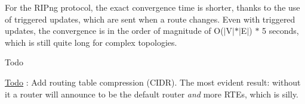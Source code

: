 For the R\+I\+Png protocol, the exact convergence time is shorter, thanks to the use of triggered updates, which are sent when a route changes. Even with triggered updates, the convergence is in the order of magnitude of O($\vert$\+V$\vert$$\ast$$\vert$\+E$\vert$) $\ast$ 5 seconds, which is still quite long for complex topologies.

\begin{DoxyRefDesc}{Todo}
\item[\hyperlink{todo__todo000062}{Todo}]\+: Add routing table compression (C\+I\+DR). The most evident result\+: without it a router will announce to be the default router {\itshape and} more R\+T\+Es, which is silly. \end{DoxyRefDesc}
